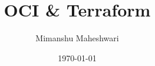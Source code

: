 \documentclass{report}
\title{\textbf{OCI \& Terraform}}
\author{Mimanshu Maheshwari}
\date{\today}
\begin{document}
\maketitle
\tableofcontents
\listoffigures
\lstlistoflistings





\printglossaries
\end{document}
